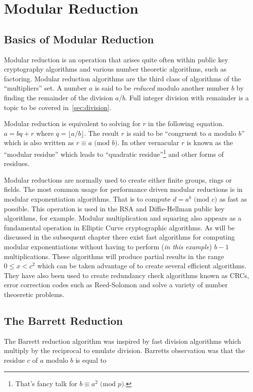 \documentclass[b5paper]{book}
\begin{document}
\chapter{Modular Reduction}
\section{Basics of Modular Reduction}
Modular reduction is an operation that arises quite often within public key cryptography algorithms and various number theoretic algorithms, 
such as factoring.  Modular reduction algorithms are the third class of algorithms of the ``multipliers'' set.  A number $a$ is said to be \textit{reduced}
modulo another number $b$ by finding the remainder of the division $a/b$.  Full integer division with remainder is a topic to be covered 
in~\ref{sec:division}.

Modular reduction is equivalent to solving for $r$ in the following equation.  $a = bq + r$ where $q = \lfloor a/b \rfloor$.  The result 
$r$ is said to be ``congruent to $a$ modulo $b$'' which is also written as $r \equiv a \mbox{ (mod }b\mbox{)}$.  In other vernacular $r$ is known as the 
``modular residue'' which leads to ``quadratic residue''\footnote{That's fancy talk for $b \equiv a^2 \mbox{ (mod }p\mbox{)}$.} and
other forms of residues.  

Modular reductions are normally used to create either finite groups, rings or fields.  The most common usage for performance driven modular reductions 
is in modular exponentiation algorithms.  That is to compute $d = a^b \mbox{ (mod }c\mbox{)}$ as fast as possible.  This operation is used in the 
RSA and Diffie-Hellman public key algorithms, for example.  Modular multiplication and squaring also appears as a fundamental operation in 
Elliptic Curve cryptographic algorithms.  As will be discussed in the subsequent chapter there exist fast algorithms for computing modular 
exponentiations without having to perform (\textit{in this example}) $b - 1$ multiplications.  These algorithms will produce partial results in the 
range $0 \le x < c^2$ which can be taken advantage of to create several efficient algorithms.   They have also been used to create redundancy check 
algorithms known as CRCs, error correction codes such as Reed-Solomon and solve a variety of number theoeretic problems.  

\section{The Barrett Reduction}
The Barrett reduction algorithm \cite{BARRETT} was inspired by fast division algorithms which multiply by the reciprocal to emulate
division.  Barretts observation was that the residue $c$ of $a$ modulo $b$ is equal to 
\end{document}
